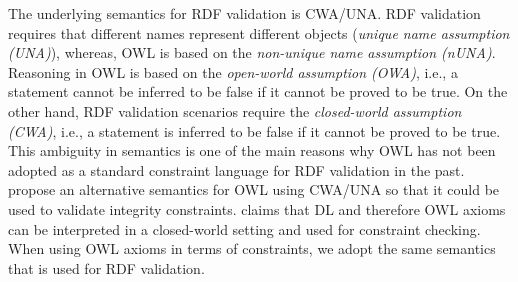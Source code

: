 \documentclass[conference]{IEEEtran}
\newcommand{\ms}[1]{\texttt{#1}}
\newcommand{\tb}[1]{\todo[size=\small, color=green!40]{\textbf{Thomas:} #1}}
\begin{document}
The underlying semantics for RDF validation is CWA/UNA.
RDF validation requires that different names represent different objects ({\em unique name assumption (UNA)}), whereas,
OWL is based on the {\em non-unique name assumption (nUNA)}.  
Reasoning in OWL is based on the {\em open-world assumption (OWA)}, i.e., a statement cannot be inferred to be false if it cannot be proved to be true. 
On the other hand, RDF validation scenarios require the {\em closed-world assumption (CWA)}, i.e., a statement is inferred to be false if it cannot be proved to be true. 
This ambiguity in semantics is one of the main reasons why OWL has not been adopted as a standard constraint language for RDF validation in the past.  
\cite{Tao-2010} propose an alternative semantics for OWL using CWA/UNA so that it could be used to validate integrity constraints.
\cite{Patel-Schneider-2015} claims that DL and therefore OWL axioms can be interpreted in a closed-world setting and used for constraint checking.
When using OWL axioms in terms of constraints, we adopt the same semantics that is used for RDF validation.
\end{document}
